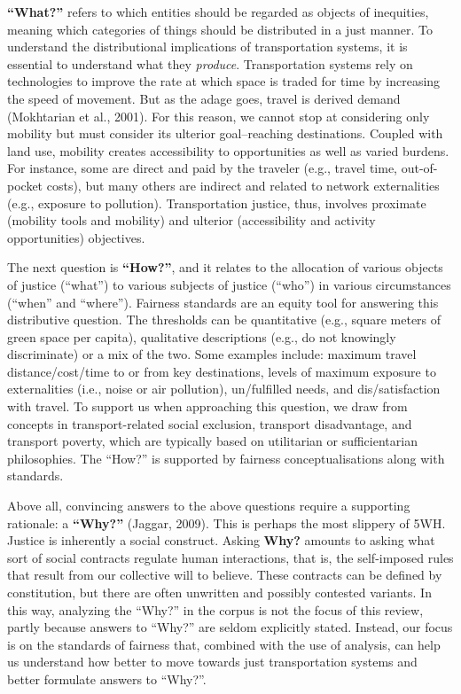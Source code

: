 \documentclass[
  letterpaper,
  DIV=11,
  numbers=noendperiod]{scrartcl}
\begin{document}
\textbf{``What?''} refers to which entities should be regarded as
objects of inequities, meaning which categories of things should be
distributed in a just manner. To understand the distributional
implications of transportation systems, it is essential to understand
what they \emph{produce}. Transportation systems rely on technologies to
improve the rate at which space is traded for time by increasing the
speed of movement. But as the adage goes, travel is derived demand
(Mokhtarian et al., 2001). For this reason, we cannot stop at
considering only mobility but must consider its ulterior goal--reaching
destinations. Coupled with land use, mobility creates accessibility to
opportunities as well as varied burdens. For instance, some are direct
and paid by the traveler (e.g., travel time, out-of-pocket costs), but
many others are indirect and related to network externalities (e.g.,
exposure to pollution). Transportation justice, thus, involves proximate
(mobility tools and mobility) and ulterior (accessibility and activity
opportunities) objectives.

The next question is \textbf{``How?''}, and it relates to the allocation
of various objects of justice (``what'') to various subjects of justice
(``who'') in various circumstances (``when'' and ``where''). Fairness
standards are an equity tool for answering this distributive question.
The thresholds can be quantitative (e.g., square meters of green space
per capita), qualitative descriptions (e.g., do not knowingly
discriminate) or a mix of the two. Some examples include: maximum travel
distance/cost/time to or from key destinations, levels of maximum
exposure to externalities (i.e., noise or air pollution), un/fulfilled
needs, and dis/satisfaction with travel. To support us when approaching
this question, we draw from concepts in transport-related social
exclusion, transport disadvantage, and transport poverty, which are
typically based on utilitarian or sufficientarian philosophies. The
``How?'' is supported by fairness conceptualisations along with
standards.

Above all, convincing answers to the above questions require a
supporting rationale: a \textbf{``Why?''} (Jaggar, 2009). This is
perhaps the most slippery of 5WH. Justice is inherently a social
construct. Asking \textbf{Why?} amounts to asking what sort of social
contracts regulate human interactions, that is, the self-imposed rules
that result from our collective will to believe. These contracts can be
defined by constitution, but there are often unwritten and possibly
contested variants. In this way, analyzing the ``Why?'' in the corpus is
not the focus of this review, partly because answers to ``Why?'' are
seldom explicitly stated. Instead, our focus is on the standards of
fairness that, combined with the use of analysis, can help us understand
how better to move towards just transportation systems and better
formulate answers to ``Why?''.
\end{document}
